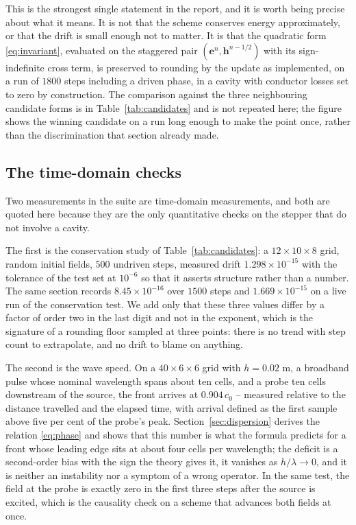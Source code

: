 This is the strongest single statement in the report, and it is worth being precise about what it means. It is
not that the scheme conserves energy approximately, or that the drift is small enough not to matter. It is that
the quadratic form \eqref{eq:invariant}, evaluated on the staggered pair $(\mathbf{e}^{n},\mathbf{h}^{n-1/2})$
with its sign-indefinite cross term, is preserved to rounding by the update as implemented, on a run of $1800$
steps including a driven phase, in a cavity with conductor losses set to zero by construction. The comparison
against the three neighbouring candidate forms is in Table~\ref{tab:candidates} and is not repeated here; the
figure shows the winning candidate on a run long enough to make the point once, rather than the discrimination
that section already made.

\subsection{The time-domain checks}
\label{sec:res-time}

Two measurements in the suite are time-domain measurements, and both are quoted here because they are the only
quantitative checks on the stepper that do not involve a cavity.

The first is the conservation study of Table~\ref{tab:candidates}: a $12\times10\times8$ grid, random initial
fields, $500$ undriven steps, measured drift $1.298\times10^{-15}$ with the tolerance of the test set at $10^{-6}$
so that it asserts structure rather than a number. The same section records $8.45\times10^{-16}$ over $1500$ steps
and $1.669\times10^{-15}$ on a live run of the conservation test. We add only that these three values differ by a
factor of order two in the last digit and not in the exponent, which is the signature of a rounding floor sampled
at three points: there is no trend with step count to extrapolate, and no drift to blame on anything.

The second is the wave speed. On a $40\times6\times6$ grid with $h=0.02$ m, a broadband pulse whose nominal
wavelength spans about ten cells, and a probe ten cells downstream of the source, the front arrives at
$0.904\,c_0$ -- measured relative to the distance travelled and the elapsed time, with arrival defined as the
first sample above five per cent of the probe's peak. Section~\ref{sec:dispersion} derives the relation
\eqref{eq:phase} and shows that this number is what the formula predicts for a front whose leading edge sits at
about four cells per wavelength; the deficit is a second-order bias with the sign the theory gives it, it
vanishes as $h/\lambda\to0$, and it is neither an instability nor a symptom of a wrong operator. In the same
test, the field at the probe is exactly zero in the first three steps after the source is excited, which is the
causality check on a scheme that advances both fields at once.

